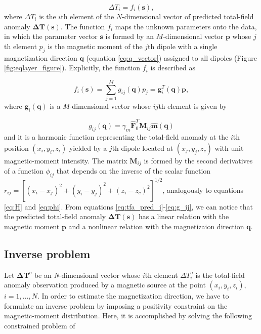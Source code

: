 \begin{equation}
\Delta T_i = f_i(\mathbf{s}) ,
\label{eq:tfa_pred_i}
\end{equation}    
where $\Delta T_i$ is the $i$th element of the $N$-dimensional vector of predicted total-field anomaly $\mathbf{\Delta T}(\mathbf{s})$. The function $f_i$ maps the unknown parameters onto the data, in which the parameter vector $\mathbf{s}$ is formed by an $M$-dimensional vector $\mathbf{p}$ whose $j$th element $p_j$ is the magnetic moment of the $j$th dipole with a single magnetization direction $\mathbf{q}$ (equation \ref{eq:q_vector}) assigned to all dipoles (Figure \ref{fig:eqlayer_figure}). Explicitly, the function $f_i$ is described as 

\begin{equation}
f_i (\mathbf{s}) = \sum_{j=1}^{M} g_{ij}(\mathbf{q}) p_j  = \mathbf{g}_{i}^T(\mathbf{q}) \mathbf{p},
\label{eq:f_i}
\end{equation}
where $\mathbf{g}_{i} (\mathbf{q})$ is a $M$-dimensional vector whose $ij$th element is given by

\begin{equation}
g_{ij} (\mathbf{q})  = \gamma_m \hat{\mathbf{F}}_0^T \mathbf{M}_{ij} \hat{\mathbf{m}}(\mathbf{q})
\label{eq:g_ij}
\end{equation}
and it is a harmonic function representing the total-field anomaly at the $i$th position $(x_i,y_i,z_i)$ yielded by a $j$th dipole located at $(x_j,y_j,z_c)$ with unit magnetic-moment intensity. The matrix $\mathbf{M}_{ij}$ is formed by the second derivatives of a function $\phi_{ij}$ that depends on the inverse of the scalar function $r_{ij} = [(x_i-x_j)^2 + (y_i-y_j)^2 + (z_i-z_c)^2]^{1/2}$, analogously to equations \ref{eq:H} and \ref{eq:phi}. From equations \ref{eq:tfa_pred_i}-\ref{eq:g_ij}, we can notice that the predicted total-field anomaly $\mathbf{\Delta T} (\mathbf{s})$ has a linear relation with the magnetic moment $\mathbf{p}$ and a nonlinear relation with the magnetizaion direction $\mathbf{q}$.    

\subsection{Inverse problem}

Let $\mathbf{\Delta T}^o$ be an \textit{N}-dimensional vector whose $i$th element $\Delta T_i^o$ is the total-field anomaly observation produced by a magnetic source at the point $(x_i,y_i,z_i)$, $i = 1, \ldots, N$. In order to estimate the magnetization direction, we have to formulate an inverse problem by imposing a positivity constraint on the magnetic-moment distribution. Here, it is accomplished by solving the following constrained problem of

